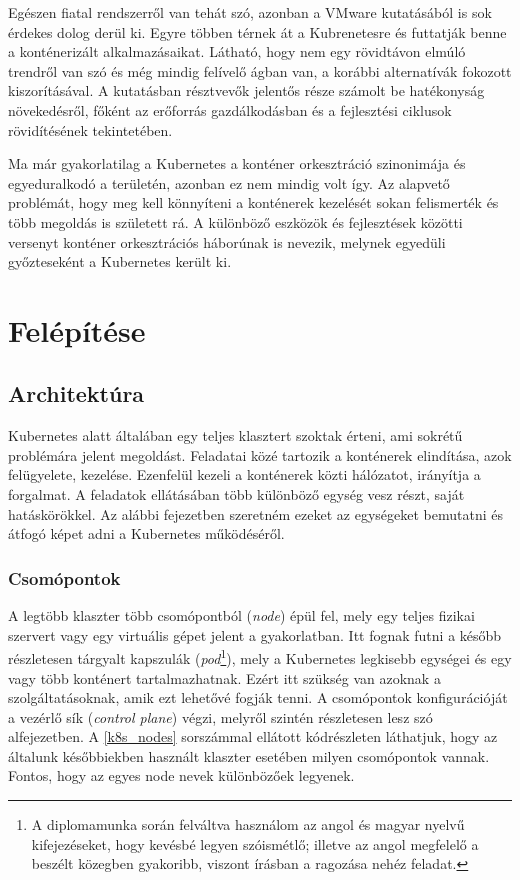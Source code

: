 Egészen fiatal rendszerről van tehát szó, azonban a VMware kutatásából\citep{VMwareSurvey} is sok érdekes dolog derül ki.
Egyre többen térnek át a Kubrenetesre és futtatják benne a konténerizált alkalmazásaikat. 
Látható, hogy nem egy rövidtávon elmúló trendről van szó és még mindig felívelő ágban van, a korábbi alternatívák fokozott kiszorításával.
A kutatásban résztvevők jelentős része számolt be hatékonyság növekedésről, főként az erőforrás gazdálkodásban és a fejlesztési ciklusok rövidítésének tekintetében.

Ma már gyakorlatilag a Kubernetes a konténer orkesztráció szinonimája és egyeduralkodó a területén, azonban ez nem mindig volt így.
Az alapvető problémát, hogy meg kell könnyíteni a konténerek kezelését sokan felismerték és több megoldás is született rá. 
A különböző eszközök és fejlesztések közötti versenyt konténer orkesztrációs háborúnak is nevezik\citep{containerOrchestrationWar}, melynek egyedüli győzteseként a Kubernetes került ki.

\section{Felépítése}

\subsection{Architektúra}
Kubernetes alatt általában egy teljes klasztert szoktak érteni, ami sokrétű problémára jelent megoldást.
Feladatai közé tartozik a konténerek elindítása, azok felügyelete, kezelése. 
Ezenfelül kezeli a konténerek közti hálózatot, irányítja a forgalmat.
A feladatok ellátásában több különböző egység vesz részt, saját hatáskörökkel. 
Az alábbi fejezetben szeretném ezeket az egységeket bemutatni és átfogó képet adni a Kubernetes működéséről.  

\subsubsection{Csomópontok}
A legtöbb klaszter több csomópontból (\textit{node}) épül fel, mely egy teljes fizikai szervert vagy egy virtuális gépet jelent a gyakorlatban.
Itt fognak futni a később részletesen tárgyalt kapszulák (\textit{pod}\footnote{A diplomamunka során felváltva használom az angol és magyar nyelvű kifejezéseket, hogy kevésbé legyen szóismétlő; illetve az angol megfelelő a beszélt közegben gyakoribb, viszont írásban a ragozása nehéz feladat.}), mely a Kubernetes legkisebb egységei és egy vagy több konténert tartalmazhatnak.
Ezért itt szükség van azoknak a szolgáltatásoknak, amik ezt lehetővé fogják tenni.
A csomópontok konfigurációját a vezérlő sík (\textit{control plane}) végzi, melyről szintén részletesen lesz szó  alfejezetben.
A \ref{k8s_nodes} sorszámmal ellátott kódrészleten láthatjuk, hogy az általunk későbbiekben használt klaszter esetében milyen csomópontok vannak.
Fontos, hogy az egyes node nevek  különbözőek legyenek. 

